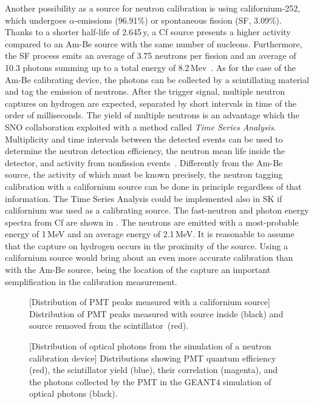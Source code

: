 Another possibility as a source for neutron calibration is using californium-252, which %
undergoes $\alpha$-emissions (96.91\%) or spontaneous fission (SF, 3.09\%).
Thanks to a shorter half-life of 2.645\,y, a Cf source presents a higher activity compared to an Am-Be source %
with the same number of nucleons.
Furthermore, the SF process emits an average of 3.75 neutrons per fission and an average of 10.3 photons %
summing up to a total energy of 8.2\,Mev~\cite{PhysRev.104.699}.
As for the case of the Am-Be calibrating device, the photons can be collected by a scintillating material %
and tag the emission of neutrons.
After the trigger signal, multiple neutron captures on hydrogen are expected, separated by short intervals in time %
of the order of milliseconds.
The yield of multiple neutrons is an advantage which the SNO collaboration exploited with a method %
called \emph{Time Series Analysis}.
Multiplicity and time intervals between the detected events can be used to determine the neutron detection efficiency, %
the neutron mean life inside the detector, and activity from nonfission events~\cite{Labranche:2004sya}.
Differently from the Am-Be source, the activity of which must be known precisely, the neutron tagging calibration %
with a californium source can be done in principle regardless of that information.
The Time Series Analysis could be implemented also in SK if californium was used as a calibrating source.
The fast-neutron and photon energy spectra from Cf are shown in . 
The neutrons are emitted with a most-probable energy of 1\,MeV and an average energy of 2.1\,MeV.
It is reasonable to assume that the capture on hydrogen occurs in the proximity of the source. %
Using a californium source would bring about an even more accurate calibration than with the Am-Be source, %
being the location of the capture an important semplification in the calibration measurement.	%


\begin{figure}
	\begin{minipage}[t]{0.48\textwidth}
		\centering
		\resizebox{\textwidth}{!}{}
		[Distribution of PMT peaks measured with a californium source]%
		{Distribution of PMT peaks measured with source inside (black) and source removed from the scintillator~(red).}
		\label{fig:source}
	\end{minipage}
	\hfill
	\begin{minipage}[t]{0.48\textwidth}
		\centering
		\resizebox{\textwidth}{!}{}
		[Distribution of optical photons from the simulation of a neutron calibration device]{%
			Distributions showing PMT quantum efficiency (red), the scintillator yield (blue), %
			their correlation (magenta), and the photons collected by the PMT in the GEANT4 %
			simulation of optical photons (black).}
		\label{fig:QE}
	\end{minipage}
\end{figure}

